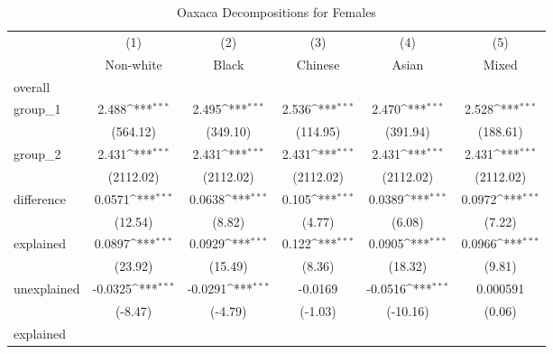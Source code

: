 {
\def\sym#1{\ifmmode^{#1}\else\(^{#1}\)\fi}
\begin{longtable}{l*{5}{c}}
\caption{Oaxaca Decompositions for Females\label{tab1}}\\
\hline\hline\endfirsthead\hline\endhead\hline\endfoot\endlastfoot
            &\multicolumn{1}{c}{(1)}&\multicolumn{1}{c}{(2)}&\multicolumn{1}{c}{(3)}&\multicolumn{1}{c}{(4)}&\multicolumn{1}{c}{(5)}\\
            &\multicolumn{1}{c}{Non-white}&\multicolumn{1}{c}{Black}&\multicolumn{1}{c}{Chinese}&\multicolumn{1}{c}{Asian}&\multicolumn{1}{c}{Mixed}\\
\hline
overall     &                     &                     &                     &                     &                     \\
group\_1     &       2.488\sym{***}&       2.495\sym{***}&       2.536\sym{***}&       2.470\sym{***}&       2.528\sym{***}\\
            &    (564.12)         &    (349.10)         &    (114.95)         &    (391.94)         &    (188.61)         \\
group\_2     &       2.431\sym{***}&       2.431\sym{***}&       2.431\sym{***}&       2.431\sym{***}&       2.431\sym{***}\\
            &   (2112.02)         &   (2112.02)         &   (2112.02)         &   (2112.02)         &   (2112.02)         \\
difference  &      0.0571\sym{***}&      0.0638\sym{***}&       0.105\sym{***}&      0.0389\sym{***}&      0.0972\sym{***}\\
            &     (12.54)         &      (8.82)         &      (4.77)         &      (6.08)         &      (7.22)         \\
explained   &      0.0897\sym{***}&      0.0929\sym{***}&       0.122\sym{***}&      0.0905\sym{***}&      0.0966\sym{***}\\
            &     (23.92)         &     (15.49)         &      (8.36)         &     (18.32)         &      (9.81)         \\
unexplained &     -0.0325\sym{***}&     -0.0291\sym{***}&     -0.0169         &     -0.0516\sym{***}&    0.000591         \\
            &     (-8.47)         &     (-4.79)         &     (-1.03)         &    (-10.16)         &      (0.06)         \\
\hline
explained   &                     &                     &                     &                     &                     \\

\end{longtable}}
